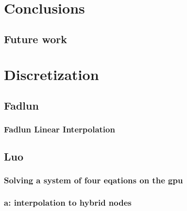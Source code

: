 \chapter{Conclusions}
\section{Future work}




\appendix
\chapter{Discretization}
\section{Fadlun}
\subsection{Fadlun Linear Interpolation}\label{Fadlun Linear Interpolation}
\section{Luo}
\subsection{Solving a system of four eqations on the gpu}\label{system of euqations}
\subsection{a: interpolation to hybrid nodes}
\label{a: interpolation to hybrid nodes}


